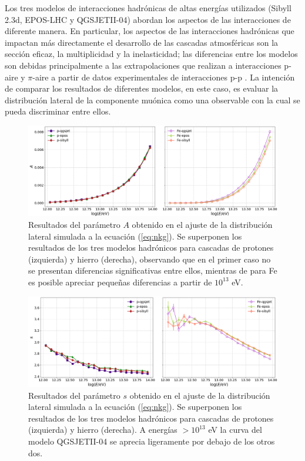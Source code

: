 	Los tres modelos de interacciones hadr\'onicas de altas energ\'ias utilizados (Sibyll 2.3d, EPOS-LHC y QGSJETII-04) abordan los aspectos de las interacciones de diferente manera. En particular, los aspectos de las interacciones hadr\'onicas que impactan m\'as directamente el desarrollo de las cascadas atmosf\'ericas son la secci\'on eficaz, la multiplicidad y la inelasticidad; las diferencias entre los modelos son debidas principalmente a las extrapolaciones que realizan a interacciones p-aire y $\pi$-aire a partir de datos experimentales de interacciones p-p \cite{Pierog2018}. La intenci\'on de comparar los resultados de diferentes modelos, en este caso, es evaluar la distribuci\'on lateral de la componente mu\'onica como una observable con la cual se pueda discriminar entre ellos.\\
		\begin{figure} []
		\includegraphics[width=\textwidth]{Figuras/models_nkgA}
		\caption{Resultados del par\'ametro $A$ obtenido en el ajuste de la distribuci\'on lateral simulada a la ecuaci\'on (\ref{eq:nkg}). Se superponen los resultados de los tres modelos hadr\'onicos para cascadas de protones (izquierda) y hierro (derecha), observando que en el primer caso no se presentan diferencias significativas entre ellos, mientras de para Fe es posible apreciar peque\~{n}as diferencias a partir de $10^{13}$ eV.}
		\label{fig:models_nkgA}
		\end{figure}	
		
		\begin{figure} []
		\includegraphics[width=\textwidth]{Figuras/models_nkgs}
		\caption{Resultados del par\'ametro $s$ obtenido en el ajuste de la distribuci\'on lateral simulada a la ecuaci\'on (\ref{eq:nkg}). Se superponen los resultados de los tres modelos hadr\'onicos para cascadas de protones (izquierda) y hierro (derecha). A energ\'ias $>10^{13}$ eV la curva del modelo QGSJETII-04 se aprecia ligeramente por debajo de los otros dos.}  
		\label{fig:models_nkgs}
		\end{figure}	
		
